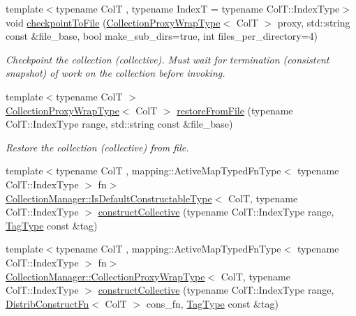 \begin{DoxyCompactItemize}
{\footnotesize template$<$typename ColT , typename IndexT  = typename Col\+T\+::\+Index\+Type$>$ }\\void \hyperlink{structvt_1_1vrt_1_1collection_1_1_collection_manager_af3771d408c2ef15e65b9ba8219aa830a}{checkpoint\+To\+File} (\hyperlink{structvt_1_1vrt_1_1collection_1_1_collection_manager_a56458ed7f9bb22b631b9b3a745f42f94}{Collection\+Proxy\+Wrap\+Type}$<$ ColT $>$ proxy, std\+::string const \&file\+\_\+base, bool make\+\_\+sub\+\_\+dirs=true, int files\+\_\+per\+\_\+directory=4)
\begin{DoxyCompactList}\small\item\em Checkpoint the collection (collective). Must wait for termination (consistent snapshot) of work on the collection before invoking. \end{DoxyCompactList}\item 
{\footnotesize template$<$typename ColT $>$ }\\\hyperlink{structvt_1_1vrt_1_1collection_1_1_collection_manager_a56458ed7f9bb22b631b9b3a745f42f94}{Collection\+Proxy\+Wrap\+Type}$<$ ColT $>$ \hyperlink{structvt_1_1vrt_1_1collection_1_1_collection_manager_a315a74b9299f31ebc5e3e4becdd9f79e}{restore\+From\+File} (typename Col\+T\+::\+Index\+Type range, std\+::string const \&file\+\_\+base)
\begin{DoxyCompactList}\small\item\em Restore the collection (collective) from file. \end{DoxyCompactList}\item 
{\footnotesize template$<$typename ColT , mapping\+::\+Active\+Map\+Typed\+Fn\+Type$<$ typename Col\+T\+::\+Index\+Type $>$ fn$>$ }\\\hyperlink{structvt_1_1vrt_1_1collection_1_1_collection_manager_af8091fcb8218dad155ea028c9b5d283f}{Collection\+Manager\+::\+Is\+Default\+Constructable\+Type}$<$ ColT, typename Col\+T\+::\+Index\+Type $>$ \hyperlink{structvt_1_1vrt_1_1collection_1_1_collection_manager_a5d1abd77ffc06ec34afa96d317f98a73}{construct\+Collective} (typename Col\+T\+::\+Index\+Type range, \hyperlink{namespacevt_a84ab281dae04a52a4b243d6bf62d0e52}{Tag\+Type} const \&tag)
\item 
{\footnotesize template$<$typename ColT , mapping\+::\+Active\+Map\+Typed\+Fn\+Type$<$ typename Col\+T\+::\+Index\+Type $>$ fn$>$ }\\\hyperlink{structvt_1_1vrt_1_1collection_1_1_collection_manager_a56458ed7f9bb22b631b9b3a745f42f94}{Collection\+Manager\+::\+Collection\+Proxy\+Wrap\+Type}$<$ ColT, typename Col\+T\+::\+Index\+Type $>$ \hyperlink{structvt_1_1vrt_1_1collection_1_1_collection_manager_a9b376e8e7145bf3d0f6b268d7974f783}{construct\+Collective} (typename Col\+T\+::\+Index\+Type range, \hyperlink{structvt_1_1vrt_1_1collection_1_1_collection_manager_a7503830bc133013d542856fa39834dcc}{Distrib\+Construct\+Fn}$<$ ColT $>$ cons\+\_\+fn, \hyperlink{namespacevt_a84ab281dae04a52a4b243d6bf62d0e52}{Tag\+Type} const \&tag)
\end{DoxyCompactItemize}
